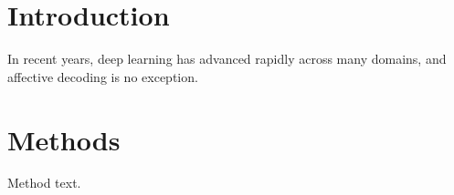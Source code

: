 \documentclass{article}
\begin{document}
\section{Introduction}
In recent years, deep learning has advanced rapidly across many domains,
and affective decoding is no exception.
\section{Methods}
Method text.
\end{document}
